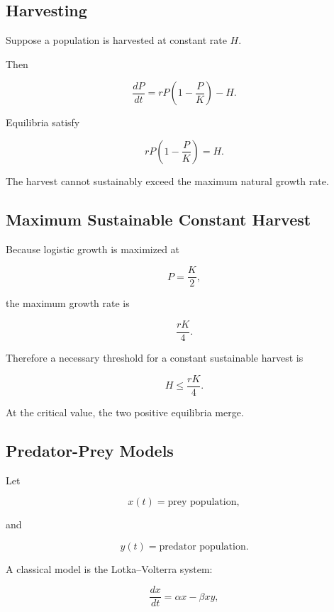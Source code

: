 \subsection{Harvesting}
\label{subsec:population-harvesting}

Suppose a population is harvested at constant rate \(H\).

Then

\[
\boxed{
\frac{dP}{dt}
=
rP
\left(
1-\frac{P}{K}
\right)
-
H.
}
\]

Equilibria satisfy

\[
rP
\left(
1-\frac{P}{K}
\right)
=
H.
\]

The harvest cannot sustainably exceed the maximum natural growth rate.

\subsection{Maximum Sustainable Constant Harvest}
\label{subsec:maximum-sustainable-harvest}

Because logistic growth is maximized at

\[
P=\frac{K}{2},
\]

the maximum growth rate is

\[
\frac{rK}{4}.
\]

Therefore a necessary threshold for a constant sustainable harvest is

\[
\boxed{
H\leq
\frac{rK}{4}.
}
\]

At the critical value, the two positive equilibria merge.

\subsection{Predator-Prey Models}
\label{subsec:predator-prey-models}

Let

\[
x(t)
=
\text{prey population},
\]

and

\[
y(t)
=
\text{predator population}.
\]

A classical model is the Lotka--Volterra system:

\[
\boxed{
\frac{dx}{dt}
=
\alpha x-\beta xy,
}
\]


